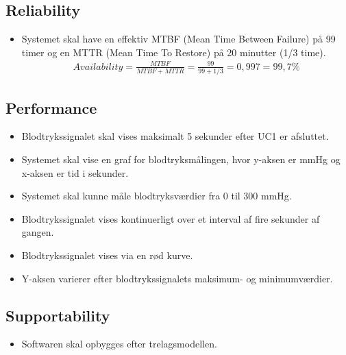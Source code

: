 \subsection{Reliability}
\begin{itemize}
	\item Systemet skal have en effektiv MTBF (Mean Time Between Failure) på 99 timer og en MTTR (Mean Time To Restore) på 20 minutter (1/3 time).
				\begin{align}
					Availability = \frac{MTBF}{MTBF+MTTR} = \frac{99}{99+1/3} = 0,997 = 99,7 \%
				\end{align}

\end{itemize}

\subsection{Performance}
\begin{itemize}
	\item Blodtrykssignalet skal vises maksimalt 5 sekunder efter UC1 er afsluttet.
	\item Systemet skal vise en graf for blodtryksmålingen, hvor y-aksen er mmHg og x-aksen er tid i sekunder.
	\item Systemet skal kunne måle blodtryksværdier fra 0 til 300 mmHg.
	\item Blodtrykssignalet vises kontinuerligt over et interval af fire sekunder af gangen.
	\item Blodtrykssignalet vises via en rød kurve. 
	\item Y-aksen varierer efter blodtrykssignalets maksimum- og minimumværdier.  
\end{itemize}

\subsection{Supportability}
\begin{itemize}
	\item Softwaren skal opbygges efter trelagsmodellen.
\end{itemize}

